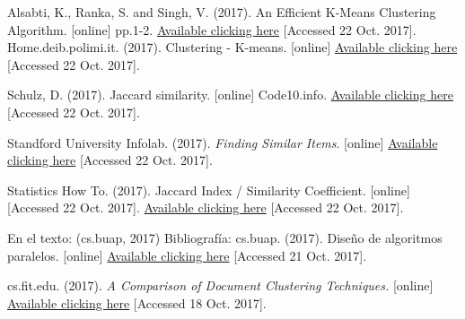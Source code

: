 \documentclass[fleqn,10pt]{SelfArx} %
\begin{document}
\begin{thebibliography}{9}

Alsabti, K., Ranka, S. and Singh, V. (2017). An Efficient K-Means Clustering Algorithm. [online] pp.1-2. \href{https://www.cs.utexas.edu/~kuipers/readings/Alsabti-hpdm-98.pdf}{Available clicking here} [Accessed 22 Oct. 2017].
Home.deib.polimi.it. (2017). Clustering - K-means. [online] \href{http://home.deib.polimi.it/matteucc/Clustering/tutorial_html/kmeans.html}{Available clicking here} [Accessed 22 Oct. 2017].


Schulz, D. (2017). Jaccard similarity. [online] Code10.info. 
\href{http://www.code10.info/index.php?option=com_content&view=article&id=60:articlejaccard-similarity&catid=38:cat_coding_algorithms_data-similarity&Itemid=57}{Available clicking here} [Accessed 22 Oct. 2017].


Standford University Infolab. (2017). \textit{Finding Similar Items}. [online] \href{http://infolab.stanford.edu/~ullman/mmds/ch3.pdf}{Available clicking here} [Accessed 22 Oct. 2017].

Statistics How To. (2017). Jaccard Index / Similarity Coefficient. [online] [Accessed 22 Oct. 2017].
\href{http://www.statisticshowto.com/jaccard-index/}{Available clicking here}  [Accessed 22 Oct. 2017].


En el texto: (cs.buap, 2017)
Bibliografía: cs.buap. (2017). Diseño de algoritmos paralelos. [online] \href{https://www.cs.buap.mx/~mtovar/doc/ProgConc/ProgramacionParalela.pdf}{Available clicking here} [Accessed 21 Oct. 2017].
\item cs.fit.edu. (2017). \textit{A Comparison of Document Clustering Techniques.} [online]  \href{http://cs.fit.edu/~pkc/classes/ml-internet/papers/steinbach00tr.pdf}{Available clicking here} [Accessed 18 Oct. 2017].

\end{thebibliography}



\end{document}
